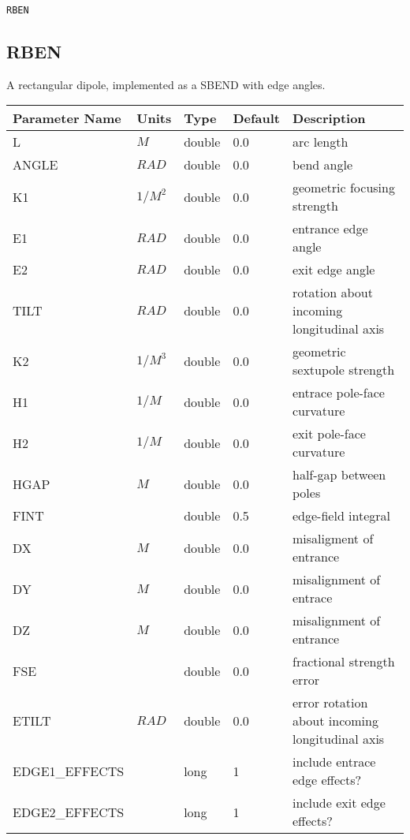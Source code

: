 \begin{latexonly}
\newpage
\begin{center}{\Large\verb|RBEN|}\end{center}
\end{latexonly}\subsection{RBEN}
A rectangular dipole, implemented as a SBEND with edge angles.
\\
\begin{tabular}{|l|l|l|l|p{\descwidth}|} \hline
Parameter Name & Units & Type & Default & Description \\ \hline 
L & $M$ & double &  0.0 & arc length  \\ \hline 
ANGLE & $RAD$ & double &  0.0 & bend angle  \\ \hline 
K1 & $1/M^{2}$ & double &  0.0 & geometric focusing strength  \\ \hline 
E1 & $RAD$ & double &  0.0 & entrance edge angle  \\ \hline 
E2 & $RAD$ & double &  0.0 & exit edge angle  \\ \hline 
TILT & $RAD$ & double &  0.0 & rotation about incoming longitudinal axis  \\ \hline 
K2 & $1/M^{3}$ & double &  0.0 & geometric sextupole strength  \\ \hline 
H1 & $1/M$ & double &  0.0 & entrace pole-face curvature  \\ \hline 
H2 & $1/M$ & double &  0.0 & exit pole-face curvature  \\ \hline 
HGAP & $M$ & double &  0.0 & half-gap between poles  \\ \hline 
FINT &  & double &   0.5 & edge-field integral  \\ \hline 
DX & $M$ & double &  0.0 & misaligment of entrance  \\ \hline 
DY & $M$ & double &  0.0 & misalignment of entrace  \\ \hline 
DZ & $M$ & double &  0.0 & misalignment of entrance  \\ \hline 
FSE &  & double &  0.0 & fractional strength error  \\ \hline 
ETILT & $RAD$ & double &  0.0 & error rotation about incoming longitudinal axis  \\ \hline 
EDGE1\_EFFECTS &  & long &   1               & include entrace edge effects?  \\ \hline 
EDGE2\_EFFECTS &  & long &   1               & include exit edge effects?  \\ \hline 

\end{tabular}
